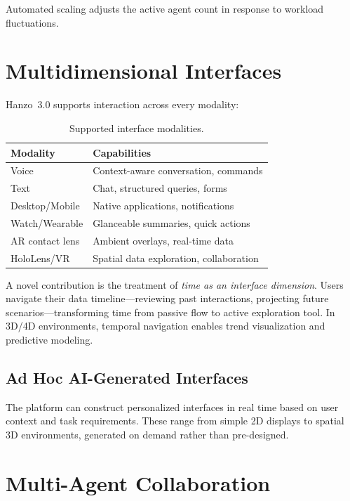 \documentclass[11pt,twocolumn]{article}
\begin{document}
Automated scaling adjusts the active agent count in response to workload
fluctuations.

\section{Multidimensional Interfaces}
\label{sec:interfaces}

Hanzo~3.0 supports interaction across every modality:

\begin{table}[H]
\centering
\small
\begin{tabular}{ll}
\toprule
\textbf{Modality} & \textbf{Capabilities} \\
\midrule
Voice & Context-aware conversation, commands \\
Text & Chat, structured queries, forms \\
Desktop/Mobile & Native applications, notifications \\
Watch/Wearable & Glanceable summaries, quick actions \\
AR contact lens & Ambient overlays, real-time data \\
HoloLens/VR & Spatial data exploration, collaboration \\
\bottomrule
\end{tabular}
\caption{Supported interface modalities.}
\label{tab:modalities}
\end{table}

A novel contribution is the treatment of \emph{time as an interface dimension}.
Users navigate their data timeline---reviewing past interactions, projecting
future scenarios---transforming time from passive flow to active exploration
tool. In 3D/4D environments, temporal navigation enables trend visualization
and predictive modeling.

\subsection{Ad Hoc AI-Generated Interfaces}

The platform can construct personalized interfaces in real time based on user
context and task requirements. These range from simple 2D displays to spatial
3D environments, generated on demand rather than pre-designed.

\section{Multi-Agent Collaboration}
\label{sec:collaboration}
\end{document}
